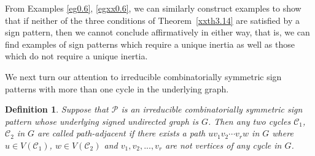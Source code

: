 \documentclass[a4paper, 10pt]{article}
\newtheorem{definition}{Definition}[section]
\numberwithin{equation}{section}
\begin{document}
From Examples \ref{eg0.6}, \ref{egxx0.6}, we can similarly construct examples to show that if neither of the three conditions of Theorem~\ref{xxth3.14} are satisfied by a sign pattern, then we cannot conclude affirmatively in either way, that is, we can find examples of sign patterns which require a unique inertia as well as those which do not require a unique inertia.



We next turn our attention to irreducible combinatorially symmetric sign patterns with more than one cycle in the underlying graph. 

\begin{definition}
	Suppose that $\mathcal{P}$ is an irreducible combinatorially symmetric sign pattern whose underlying signed undirected graph is $G$. Then any two cycles $\mathcal{C}_1$, $\mathcal{C}_2$ in $G$ are called \textit{path-adjacent} if there exists a path $uv_1v_2\cdots v_{r}w$ in $G$ where $u\in V(\mathcal{C}_1)$, $w\in V(\mathcal{C}_2)$ and $v_1,v_2,...,v_{r}$ are not vertices of any cycle in $G$.
\end{definition}
\end{document}
